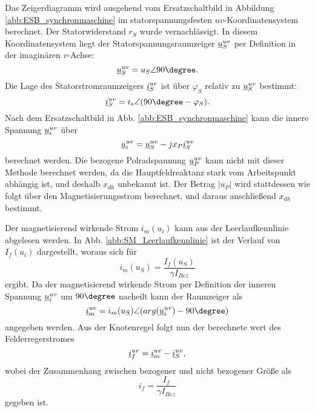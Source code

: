 \noindent Das Zeigerdiagramm wird ausgehend vom Ersatzschaltbild in Abbildung \ref{abb:ESB_synchronmaschine} im statorspannungsfesten $uv$-Koordinatensystem berechnet. Der Statorwiderstand $r_S$ wurde vernachlässigt. In diesem Koordinatensystem liegt der Statorspannungsraumzeiger $\underline{u}^{uv}_S$ per Definition in der imaginären $v$-Achse:
\begin{equation*}
    \zuv{u}_S = u_S \angle 90\degree.
\end{equation*}
Die Lage des Statorstromraumzeigers $\underline{i}^{uv}_S$ ist über $\varphi_S$ relativ zu $\underline{u}^{uv}_S$ bestimmt:
\begin{equation*}
    \zuv{i}_S=i_s \angle (90\degree-\varphi_S).
\end{equation*}
Nach dem Ersatzschaltbild in Abb. \ref{abb:ESB_synchronmaschine} kann die innere Spannung $\underline{u}^{uv}_i$ über
\begin{equation*}
    \underline{u}^{uv}_i=\underline{u}^{uv}_S-j x_P \underline{i}^{uv}_S
\end{equation*}
berechnet werden. Die bezogene Polradspannung $\underline{u}^{uv}_P$ kann nicht mit dieser Methode berechnet werden, da die Hauptfeldreaktanz stark vom Arbeitspunkt abhängig ist, und deshalb $x_{dh}$ unbekannt ist. Der Betrag $|u_P|$ wird stattdessen wie folgt über den Magnetisierungsstrom berechnet, und daraus anschließend $x_{dh}$ bestimmt.

\noindent Der magnetisierend wirkende Strom $i_m(u_i)$ kann aus der Leerlaufkennlinie abgelesen werden. In Abb. \ref{abb:SM_Leerlaufkennlinie} ist der Verlauf von $I_f(u_i)$ dargestellt, woraus sich für
\begin{equation*}
    i_m(u_S)=\frac{I_f(u_S)}{\gamma I_{Bez}}
\end{equation*}
ergibt. Da der magnetisierend wirkende Strom per Definition der inneren Spannung $\underline{u}^{uv}_i$ um $90\degree$ nacheilt kann der Raumzeiger als
\begin{equation*}
    \zuv{i}_m=i_m(u_S) \angle (arg(\zuv{u}_i)-90\degree)
\end{equation*}
angegeben werden. Aus der Knotenregel folgt nun der berechnete wert des Felderregerstromes
\begin{equation*}
    \underline{i}^{uv}_f=\underline{i}^{uv}_m-\underline{i}^{uv}_S, 
\end{equation*}
wobei der Zusammenhang zwischen bezogener und nicht bezogener Größe als
\begin{equation*}
    i_f=\frac{I_f}{\gamma I_{Bez}}
\end{equation*}
gegeben ist.

